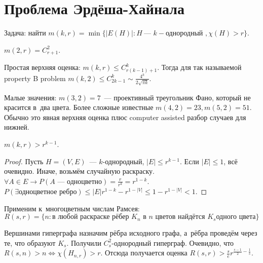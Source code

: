 \documentclass{article}
\begin{document}
\section{Проблема Эрдёша-Хайнала}

Задача: найти $m(k, r) = \min\{ |E(H)|: H~\text{--- }k-\text{однородный }, \chi(H) > r\}$.

\begin{exercise}
	$m(2, r) = C_{r+1}^2$.
\end{exercise}

Простая верхняя оценка: $m(k, r) \le C_{r(k-1)+1}^k$. Тогда для так называемой
property B problem $m(k, 2) \le C_{2k-1}^k \sim \frac{4^k}{2\sqrt{\pi k}}$.

Малые значения: $m(3, 2) = 7$~--- проективный треугольник Фано, который не
красится в~два цвета. Более сложные известные $m(4,2) = 23, m(5,2) = 51$.
Обычно это явная верхняя оценка плюс computer assisted разбор случаев для
нижней.

\begin{lemma}
	$m(k, r) > r^{k-1}$.
\end{lemma}
\begin{proof}
	Пусть $H = (V, E)$~--- $k$-однородный, $|E| \le r^{k-1}$. Если $|E| \le 1$,
	всё очевидно. Иначе, возьмём случайную раскраску. $\forall A \in E \rightarrow
	P(A\text{~--- одноцветно}) = \frac{r}{r^k} = r^{1-k}$. $P(\exists
	\text{одноцветное ребро}) \le |E|r^{1-k} - r^{1-|V|} \le 1 - r^{1-|V|} < 1$.
\end{proof}

Применим к~многоцветным числам Рамсея:
$$R(s, r) = \{n: \text{в~любой раскраске рёбер $K_n$ в~$n$ цветов найдётся $K_s$
одного цвета}\}$$

Вершинами гиперграфа назначим рёбра исходного графа, а~рёбра проведём через те,
что образуют $K_s$. Получили $C_s^2$-однородный гиперграф. Очевидно, что
$R(s, n) > n \Leftrightarrow \chi(H_{n,r}) > r$. Отсюда получается оценка
$R(s, r) > \frac{s}{e} r^{\frac{s-1}{2} - \frac{1}{s}}$.
\end{document}
